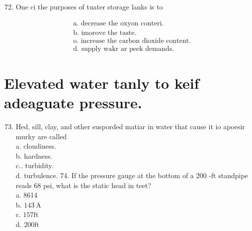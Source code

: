 \documentclass[10pt]{article}
\begin{document}

\begin{enumerate}
  \setcounter{enumi}{71}
  \item One ci the purposes of tuater storage lanks is to
\end{enumerate}

$$
\begin{aligned}
&\text { a. decrease the oxyon conteri. } \\
&\text { b. imorove the taste. } \\
&\text { o. increase the carbon dioxide content. } \\
&\text { d. supply wakr ar peek demands. }
\end{aligned}
$$

\section{Elevated water tanly to keif adeaguate pressure.}
\begin{enumerate}
  \setcounter{enumi}{72}
  \item Hed, sill, clay, and other susporded matiar in water that cause it io apoesir murky are called\\
a. cloudiness.\\
b. hardness.\\
c.. turbidity.\\
d. turbulence. 74. If the pressure gauge at the bottom of a 200 -ft standpipe reads 68 psi, what is the static head in teet?\\
a. 8614\\
b. $143 \mathrm{~A}$\\
c. $157 \mathrm{ft}$\\
d. $200 \mathrm{ft}$
\end{enumerate}
\end{document}
